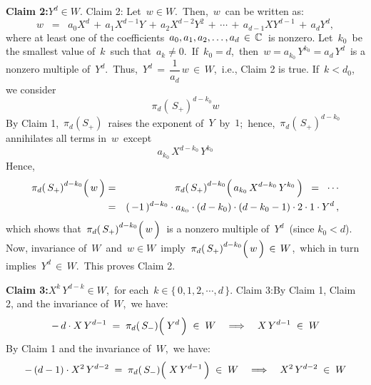 \begin{enumerate}
	\vskip 0.5cm
	\noindent
	\textbf{Claim 2:}\quad $Y^{d} \in W$.
	\vskip -0.05cm
	\noindent
	\proofof Claim 2:\quad 
	Let \,$w \in W$.\, Then, \,$w$\, can be written as:
	\begin{equation*}
	w
	\;\; = \;\;
		a_{0}X^{d} \,+\, a_{1}X^{d-1}Y \,+\, a_{2}X^{d-2}Y^{2} \,+\, \cdots \,+\, a_{d-1}XY^{d-1} \,+\, a_{d}Y^{d},
	\end{equation*}
	where at least one of the coefficients
	\,$a_{0}, a_{1}, a_{2}, \ldots, a_{d} \,\in\, \mathbb{C}$\,
	is nonzero.
	Let \,$k_{0}$\, be the smallest value of \,$k$\, such that \,$a_{k} \neq 0$.\,
	If \,$k_{0} = d$,\ then \,$w = a_{k_{0}}\,Y^{k_{0}} = a_{d}\,Y^{d}$\, is a nonzero multiple of \,$Y^{d}$.\,
	Thus, \,$Y^{d} \,=\, \dfrac{1}{a_{d}}\,w \,\in\, W$,\, i.e., Claim 2 is true.
	If \,$k < d_{0}$,\, we consider
	\begin{equation*}
	\pi_{d}\!\left(\,S_{+}\right)^{d - k_{0}}w
	\end{equation*}
	By Claim 1, \,$\pi_{d}(S_{+})$\, raises the exponent of \,$Y$\, by \,$1$;\, hence,
	\,$\pi_{d}\!\left(\,S_{+}\right)^{d - k_{0}}$\,
	annihilates all terms in \,$w$\, except
	\begin{equation*}
	a_{k_{0}}\,X^{d-k_{0}}\,Y^{k_{0}}
	\end{equation*}
	Hence,
	\begin{eqnarray*}
	\pi_{d}\!\left(\,S_{+}\right)^{d - k_{0}}\!\left(\,\overset{{\color{white}1}}{w}\,\right)
	& = &
		\pi_{d}\!\left(\,S_{+}\right)^{d - k_{0}}\!\left(\,
			\overset{{\color{white}1}}{a_{k_{0}}}\,X^{d-k_{0}}\,Y^{k_{0}}
			\,\right)
	\;\; = \;\;
		\cdots
	\\
	& = &
		(\,-1\,)^{d-k_{0}} \cdot a_{k_{0}} \cdot (d-k_{0}) \cdot (d-k_{0}-1) \cdot 2 \cdot 1 \cdot Y^{d}\,,
	\end{eqnarray*}	
	which shows that
	\,$\pi_{d}\!\left(\,S_{+}\right)^{d - k_{0}}\!\left(\,\overset{{\color{white}1}}{w}\,\right)$\,
	is a nonzero multiple of \,$Y^{d}$\, (since $k_{0} < d$).
	Now, invariance of \,$W$\, and \,$w \in W$\, imply
	\,$\pi_{d}\!\left(\,S_{+}\right)^{d - k_{0}}\!\left(\,\overset{{\color{white}1}}{w}\,\right) \,\in\, W$,\,
	which in turn implies
	\,$Y^{d} \,\in\, W$.\,
	This proves Claim 2.

	\vskip 0.5cm
	\noindent
	\textbf{Claim 3:}\quad $X^{k}\,Y^{d-k} \in W$,\, for each \,$k \in \{\,0,1,2,\cdots,d\,\}$.
	\vskip -0.05cm
	\noindent
	\proofof Claim 3:\quad By Claim 1, Claim 2, and the invariance of \,$W$,\, we have:
	\begin{equation*}
	 -\,d \cdot X \, Y^{d-1}
	\; = \;
		\pi_{d}\!\left(\,S_{-}\right)\!\left(\;\overset{{\color{.}}}{Y^{d}}\,\right)
		\; \in \; W
	\quad \Longrightarrow \quad
		X \, Y^{d-1} \; \in \; W
	\end{equation*}
	By Claim 1 and the invariance of \,$W$,\, we have:
	\begin{equation*}
	 -\,(d-1) \cdot X^{2} \, Y^{d-2}
	\; = \;
		\pi_{d}\!\left(\,S_{-}\right)\!\left(\;\overset{{\color{.}}}{X}\,Y^{d-1}\,\right)
		\; \in \; W
	\quad \Longrightarrow \quad
		X^{2} \, Y^{d-2} \; \in \; W
	\end{equation*}


\end{enumerate}
